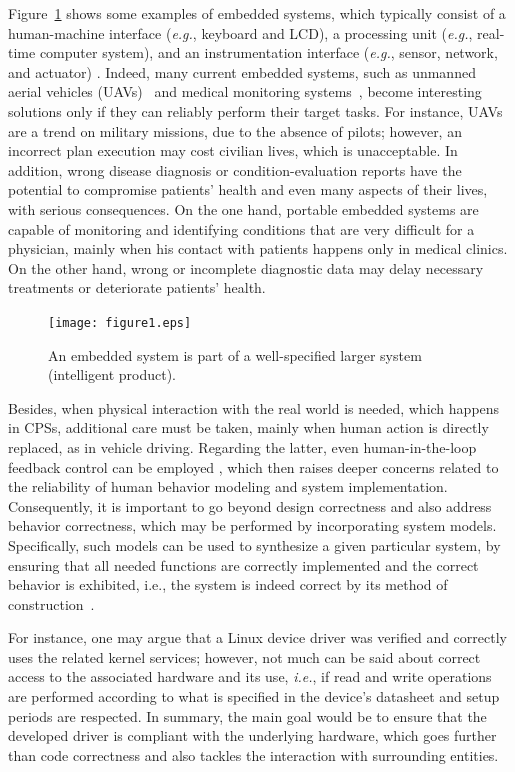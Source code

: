 \documentclass{acm_sen_article}
\begin{document}
Figure~\ref{intelligent-product} shows some examples of embedded systems, which typically consist of a human-machine interface ({\it e.g.}, keyboard and LCD), a processing unit ({\it e.g.}, real-time computer system), and an instrumentation interface ({\it e.g.}, sensor, network, and actuator) \cite{Kopetz11}. Indeed, many current embedded systems, such as unmanned aerial vehicles (UAVs)~\cite{groza2015formal} and medical monitoring systems~\cite{Cordeiro09}, become interesting solutions only if they can reliably perform their target tasks. For instance, UAVs are a trend on military missions, due to the absence of pilots; however, an incorrect plan execution may cost civilian lives, which is unacceptable. In addition, wrong disease diagnosis or condition-evaluation reports have the potential to compromise patients' health and even many aspects of their lives, with serious consequences. On the one hand, portable embedded systems are capable of monitoring and identifying conditions that are very difficult for a physician, mainly when his contact with patients happens only in medical clinics. On the other hand, wrong or incomplete diagnostic data may delay necessary treatments or deteriorate patients' health. 
%
\begin{figure}[!t]
	\centering
	\texttt{[image: figure1.eps]}
	\caption{An embedded system is part of a well-specified larger system (intelligent product).}
	\label{intelligent-product}
\end{figure}

Besides, when physical interaction with the real world is needed, which happens in CPSs, additional care must be taken, mainly when human action is directly replaced, as in vehicle driving. Regarding the latter, even human-in-the-loop feedback control can be employed \cite{munir}, which then raises deeper concerns related to the reliability of human behavior modeling and system implementation. Consequently, it is important to go beyond design correctness and also address behavior correctness, which may be performed by incorporating system models. Specifically, such models can be used to synthesize a given particular system, by ensuring that all needed functions are correctly implemented and the correct behavior is exhibited, {i.e.}, the system is indeed correct by its method of construction~\cite{Abate17}.

For instance, one may argue that a Linux device driver \cite{ldd} was verified and correctly uses the related kernel services; however, not much can be said about correct access to the associated hardware and its use, {\it i.e.}, if read and write operations are performed according to what is specified in the device's datasheet and setup periods are respected. In summary, the main goal would be to ensure that the developed driver is compliant with the underlying hardware, which goes further than code correctness and also tackles the interaction with surrounding entities.
\end{document}
